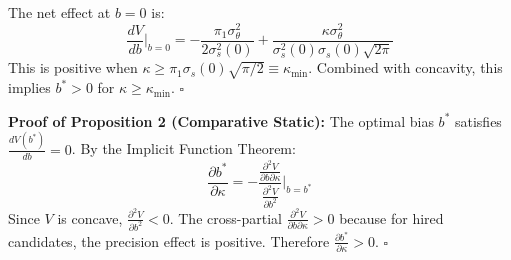 The net effect at $b=0$ is:
\begin{equation}
\frac{dV}{db}\Big|_{b=0} = -\frac{\pi_1 \sigma_\theta^2}{2\sigma_s^2(0)} + \frac{\kappa \sigma_\theta^2}{\sigma_s^2(0)\sigma_s(0)\sqrt{2\pi}}
\end{equation}
This is positive when $\kappa \geq \pi_1 \sigma_s(0) \sqrt{\pi/2} \equiv \kappa_{\min}$. Combined with concavity, this implies $b^* > 0$ for $\kappa \geq \kappa_{\min}$. $\square$

\textbf{Proof of Proposition 2 (Comparative Static):} The optimal bias $b^*$ satisfies $\frac{dV(b^*)}{db} = 0$. By the Implicit Function Theorem:
\begin{equation}
\frac{\partial b^*}{\partial \kappa} = -\frac{\frac{\partial^2 V}{\partial b \partial \kappa}}{\frac{\partial^2 V}{\partial b^2}}\bigg|_{b=b^*}
\end{equation}
Since $V$ is concave, $\frac{\partial^2 V}{\partial b^2} < 0$. The cross-partial $\frac{\partial^2 V}{\partial b \partial \kappa} > 0$ because for hired candidates, the precision effect is positive. Therefore $\frac{\partial b^*}{\partial \kappa} > 0$. $\square$